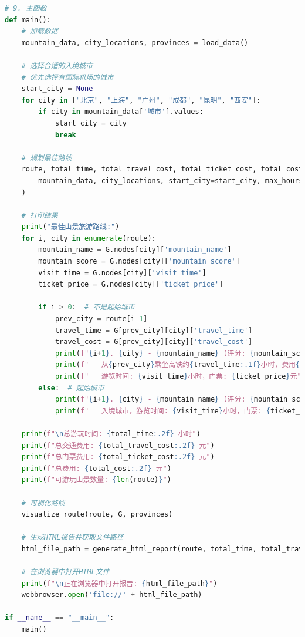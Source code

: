 \documentclass[withoutpreface,bwprint]{cumcmthesis} %
\begin{document}
\begin{appendices}
\begin{lstlisting}[language=python]
# 9. 主函数
def main():
    # 加载数据
    mountain_data, city_locations, provinces = load_data()
    
    # 选择合适的入境城市
    # 优先选择有国际机场的城市
    start_city = None
    for city in ["北京", "上海", "广州", "成都", "昆明", "西安"]:
        if city in mountain_data['城市'].values:
            start_city = city
            break
    
    # 规划最佳路线
    route, total_time, total_travel_cost, total_ticket_cost, total_cost, G = plan_optimal_route(
        mountain_data, city_locations, start_city=start_city, max_hours=144
    )
    
    # 打印结果
    print("最佳山景旅游路线:")
    for i, city in enumerate(route):
        mountain_name = G.nodes[city]['mountain_name']
        mountain_score = G.nodes[city]['mountain_score']
        visit_time = G.nodes[city]['visit_time']
        ticket_price = G.nodes[city]['ticket_price']
        
        if i > 0:  # 不是起始城市
            prev_city = route[i-1]
            travel_time = G[prev_city][city]['travel_time']
            travel_cost = G[prev_city][city]['travel_cost']
            print(f"{i+1}. {city} - {mountain_name} (评分: {mountain_score:.1f})")
            print(f"   从{prev_city}乘坐高铁约{travel_time:.1f}小时，费用{travel_cost:.0f}元")
            print(f"   游览时间: {visit_time}小时，门票: {ticket_price}元")
        else:  # 起始城市
            print(f"{i+1}. {city} - {mountain_name} (评分: {mountain_score:.1f})")
            print(f"   入境城市，游览时间: {visit_time}小时，门票: {ticket_price}元")
    
    print(f"\n总游玩时间: {total_time:.2f} 小时")
    print(f"总交通费用: {total_travel_cost:.2f} 元")
    print(f"总门票费用: {total_ticket_cost:.2f} 元")
    print(f"总费用: {total_cost:.2f} 元")
    print(f"可游玩山景数量: {len(route)}")
    
    # 可视化路线
    visualize_route(route, G, provinces)
    
    # 生成HTML报告并获取文件路径
    html_file_path = generate_html_report(route, total_time, total_travel_cost, total_ticket_cost, total_cost, G)
    
    # 在浏览器中打开HTML文件
    print(f"\n正在浏览器中打开报告: {html_file_path}")
    webbrowser.open('file://' + html_file_path)

if __name__ == "__main__":
    main()

 \end{lstlisting}




\end{appendices}
\end{document}
